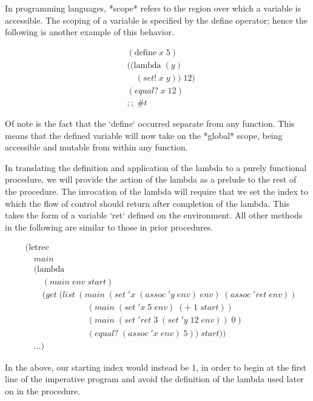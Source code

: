 In programming languages, *scope* refers to the region over which a variable is
accessible. The scoping of a variable is specified by the define operator; hence the 
following is another example of this behavior.

\begin{align*}
& (\text{define} \; x \; 5)
\\& ((\text{lambda} \; (y)
\\& \quad (set! \; x \; y)) \; 12)
\\& (equal? \; x \; 12) \; 
\\& ;; \; \#t
\end{align*}

Of note is the fact that the `define` occurred separate from any function. This 
means that the defined variable will now take on the *global* scope, being accessible 
and mutable from within any function. 

In translating the definition and application of the lambda to a purely functional
procedure, we will provide the action of the lambda as a prelude to the rest of the 
procedure. The invocation of the lambda will require that we set the index to which
the flow of control should return after completion of the lambda. This takes the form
of a variable `ret` defined on the environment. All other methods in the following are
similar to those in prior procedures.

\begin{align*}
& (\text{letrec} \; 
\\& \quad main \; 
\\& \quad (\text{lambda} \; 
\\& \qquad (main \; env \; start)
\\& \qquad (get \; (list \; (main \; (set \; 'x \; (assoc \; 'y \; env) \; env) \; (assoc \; 'ret \; env))
\\& \qquad \qquad \qquad \quad \; (main \; (set \; 'x \; 5 \; env) \; (+ \; 1 \; start))
\\& \qquad \qquad \qquad \quad \; (main \; (set \; 'ret \; 3 \; (set \; 'y \; 12 \; env)) \; 0)
\\& \qquad \qquad \qquad \quad \; (equal? \; (assoc \; 'x \; env) \; 5)) \; start))
\\& \quad \dots)
\end{align*}

In the above, our starting index would instead be 1, in order to begin at the first
line of the imperative program and avoid the definition of the lambda used later on
in the procedure.

